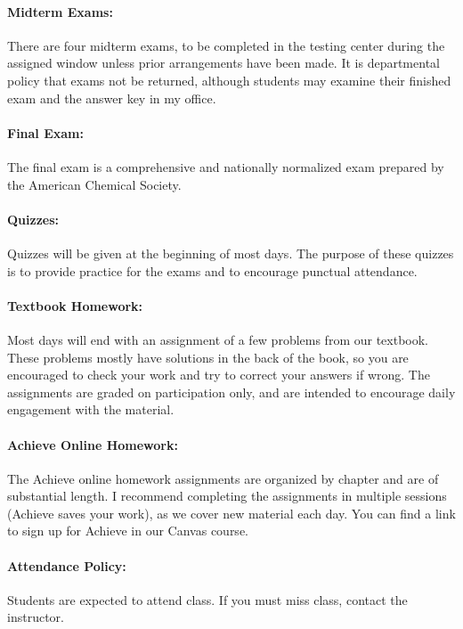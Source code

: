 \documentclass[12pt, letterpaper]{article}
\begin{document}
\paragraph{Midterm Exams:}
There are four midterm exams, to be completed in the testing center during the assigned window unless prior arrangements have been made. It is departmental policy that exams not be returned, although students may examine their finished exam and the answer key in my office.

\paragraph{Final Exam:}
The final exam is a comprehensive and nationally normalized exam prepared by the American Chemical Society.

\paragraph{Quizzes:}
Quizzes will be given at the beginning of most days. The purpose of these quizzes is to provide practice for the exams and to encourage punctual attendance.

\paragraph{Textbook Homework:}
Most days will end with an assignment of a few problems from our textbook. These problems mostly have solutions in the back of the book, so you are encouraged to check your work and try to correct your answers if wrong. The assignments are graded on participation only, and are intended to encourage daily engagement with the material.

\paragraph{Achieve Online Homework:}
The Achieve online homework assignments are organized by chapter and are of substantial length. I recommend completing the assignments in multiple sessions (Achieve saves your work), as we cover new material each day. You can find a link to sign up for Achieve in our Canvas course.

\paragraph{Attendance Policy:}
Students are expected to attend class. If you must miss class, contact the instructor.
\end{document}
